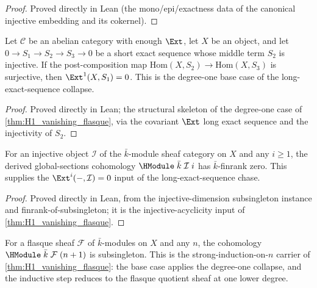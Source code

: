 \begin{proof}\leanok
 Proved directly in Lean (the mono/epi/exactness data of
  the canonical injective embedding and its cokernel).
\end{proof}

\begin{lemma}
  \label{lem:ext_one_eq_zero_of_hom_surjective_of_injective}
  Let \(\mathcal C\) be an abelian category with enough \(\Ext\), let
  \(X\) be an object, and let \(0 \to S_1 \to S_2 \to S_3 \to 0\) be a
  short exact sequence whose middle term \(S_2\) is injective. If the
  post-composition map \(\mathrm{Hom}(X, S_2) \to \mathrm{Hom}(X, S_3)\)
  is surjective, then \(\Ext^1(X, S_1) = 0\). This is the degree-one
  base case of the long-exact-sequence collapse.
\end{lemma}

\begin{proof}\leanok
 Proved directly in Lean; the structural skeleton of the
  degree-one case of \cref{thm:H1_vanishing_flasque}, via the covariant
  \(\Ext\) long exact sequence and the injectivity of \(S_2\).
\end{proof}

\begin{lemma}
  \label{lem:HModule_injective_finrank_eq_zero}
  For an injective object \(\mathcal I\) of the \(\bar k\)-module sheaf
  category on \(X\) and any \(i \ge 1\), the derived global-sections
  cohomology \(\HModule\;\bar k\;\mathcal I\;i\) has \(\bar k\)-finrank
  zero. This supplies the \(\Ext^i(-, \mathcal I) = 0\) input of the
  long-exact-sequence chase.
\end{lemma}

\begin{proof}\leanok
 Proved directly in Lean, from the injective-dimension
  subsingleton instance and finrank-of-subsingleton; it is the
  injective-acyclicity input of \cref{thm:H1_vanishing_flasque}.
\end{proof}

\begin{lemma}
  \label{lem:HModule_flasque_subsingleton_aux}
  For a flasque sheaf \(\mathcal F\) of \(\bar k\)-modules on \(X\) and
  any \(n\), the cohomology \(\HModule\;\bar k\;\mathcal F\;(n+1)\) is
  subsingleton. This is the strong-induction-on-\(n\) carrier of
  \cref{thm:H1_vanishing_flasque}: the base case applies the degree-one
  collapse, and the inductive step reduces to the flasque quotient sheaf
  at one lower degree.
\end{lemma}

